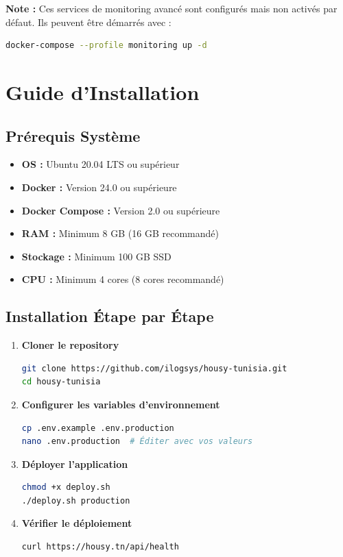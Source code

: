 \textbf{Note :} Ces services de monitoring avancé sont configurés mais non activés par défaut. Ils peuvent être démarrés avec :

\begin{lstlisting}[language=bash]
docker-compose --profile monitoring up -d
\end{lstlisting}

\section{Guide d'Installation}

\subsection{Prérequis Système}

\begin{itemize}
    \item \textbf{OS :} Ubuntu 20.04 LTS ou supérieur
    \item \textbf{Docker :} Version 24.0 ou supérieure
    \item \textbf{Docker Compose :} Version 2.0 ou supérieure
    \item \textbf{RAM :} Minimum 8 GB (16 GB recommandé)
    \item \textbf{Stockage :} Minimum 100 GB SSD
    \item \textbf{CPU :} Minimum 4 cores (8 cores recommandé)
\end{itemize}

\subsection{Installation Étape par Étape}

\begin{enumerate}
    \item \textbf{Cloner le repository}
    \begin{lstlisting}[language=bash]
git clone https://github.com/ilogsys/housy-tunisia.git
cd housy-tunisia
    \end{lstlisting}
    
    \item \textbf{Configurer les variables d'environnement}
    \begin{lstlisting}[language=bash]
cp .env.example .env.production
nano .env.production  # Éditer avec vos valeurs
    \end{lstlisting}
    
    \item \textbf{Déployer l'application}
    \begin{lstlisting}[language=bash]
chmod +x deploy.sh
./deploy.sh production
    \end{lstlisting}
    
    \item \textbf{Vérifier le déploiement}
    \begin{lstlisting}[language=bash]
curl https://housy.tn/api/health
    \end{lstlisting}
\end{enumerate}

